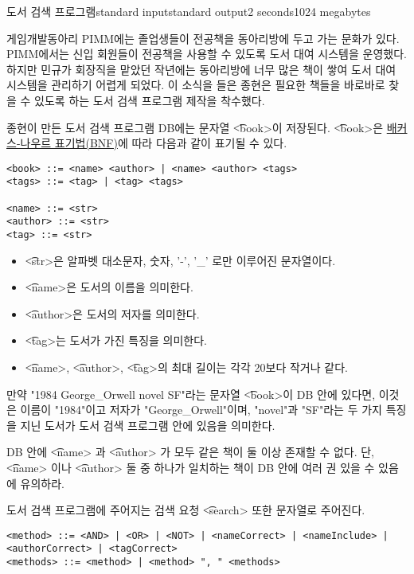 \begin{problem}{도서 검색 프로그램}{standard input}{standard output}{2 seconds}{1024 megabytes}

게임개발동아리 PIMM에는 졸업생들이 전공책을 동아리방에 두고 가는 문화가 있다. PIMM에서는 신입 회원들이 전공책을 사용할 수 있도록 도서 대여 시스템을 운영했다. 하지만 민규가 회장직을 맡았던 작년에는 동아리방에 너무 많은 책이 쌓여 도서 대여 시스템을 관리하기 어렵게 되었다. 이 소식을 들은 종현은 필요한 책들을 바로바로 찾을 수 있도록 하는 도서 검색 프로그램 제작을 착수했다.

종현이 만든 도서 검색 프로그램 DB에는 문자열 \t{<book>}이 저장된다. \t{<book>}은 \href{https://ko.wikipedia.org/wiki/배커스-나우르_표기법}{배커스-나우르 표기법(BNF)}에 따라 다음과 같이 표기될 수 있다.

\begin{lstlisting}
<book> ::= <name> <author> | <name> <author> <tags>
<tags> ::= <tag> | <tag> <tags>

<name> ::= <str>
<author> ::= <str>
<tag> ::= <str>
\end{lstlisting}

\begin{itemize}
  \item \t{<str>}은 알파벳 대소문자, 숫자, '-', '_' 로만 이루어진 문자열이다.
  \item \t{<name>}은 도서의 이름을 의미한다.
  \item \t{<author>}은 도서의 저자를 의미한다. 
  \item \t{<tag>}는 도서가 가진 특징을 의미한다.
  \item \t{<name>}, \t{<author>}, \t{<tag>}의 최대 길이는 각각 20보다 작거나 같다.
\end{itemize}

만약 "1984 George_Orwell novel SF"라는 문자열 \t{<book>}이 DB 안에 있다면, 이것은 
이름이 "1984"이고 저자가 "George_Orwell"이며, "novel"과 "SF"라는 두 가지 특징을 지닌 도서가 도서 검색 프로그램 안에 있음을 의미한다.

DB 안에 \t{<name>} 과 \t{<author>} 가 모두 같은 책이 둘 이상 존재할 수 없다. 단, \t{<name>} 이나 \t{<author>} 둘 중 하나가 일치하는 책이 DB 안에 여러 권 있을 수 있음에 유의하라.


도서 검색 프로그램에 주어지는 검색 요청 \t{<search>} 또한 문자열로 주어진다.

\begin{lstlisting}
<method> ::= <AND> | <OR> | <NOT> | <nameCorrect> | <nameInclude> | <authorCorrect> | <tagCorrect>
<methods> ::= <method> | <method> ", " <methods>


\end{lstlisting}
\end{problem}
